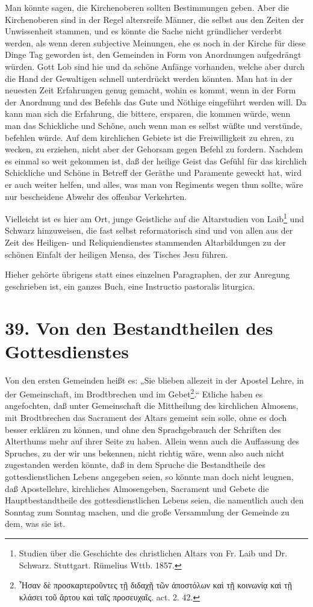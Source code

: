 Man könnte sagen, die Kirchenoberen sollten Bestimmungen geben. Aber die Kirchenoberen sind in der Regel altersreife Männer, die selbst aus den Zeiten der Unwissenheit stammen, und es könnte die Sache nicht gründlicher verderbt werden, als wenn deren subjective Meinungen, ehe es noch in der Kirche für diese Dinge Tag geworden ist, den Gemeinden
in Form von Anordnungen aufgedrängt würden. Gott Lob sind hie und da schöne Anfänge vorhanden, welche aber durch die Hand der Gewaltigen schnell unterdrückt werden könnten. Man hat in der neuesten Zeit Erfahrungen genug gemacht, wohin es kommt, wenn in der Form der Anordnung und des Befehls das Gute und Nöthige eingeführt werden will. Da kann man sich die Erfahrung, die bittere, ersparen, die kommen würde, wenn man das Schickliche und Schöne, auch wenn man es selbst wüßte und verstünde, befehlen würde. Auf dem kirchlichen Gebiete ist die Freiwilligkeit zu ehren, zu wecken, zu erziehen, nicht aber der Gehorsam gegen Befehl zu fordern. Nachdem es einmal so weit gekommen ist, daß der heilige Geist das Gefühl für das kirchlich Schickliche und Schöne in Betreff der Geräthe und Paramente geweckt hat, wird er auch weiter helfen, und alles, was man von Regiments wegen thun sollte, wäre nur bescheidene Abwehr des offenbar Verkehrten.

Vielleicht ist es hier am Ort, junge Geistliche auf die Altarstudien von Laib\footnote{Studien über die Geschichte des christlichen Altars von Fr. Laib und Dr. Schwarz. Stuttgart. Rümelius Wttb. 1857.} und Schwarz hinzuweisen, die fast selbst reformatorisch sind und von allen aus der Zeit des Heiligen- und Reliquiendienstes stammenden Altarbildungen zu der schönen Einfalt der heiligen Mensa, des Tisches Jesu führen.

Hieher gehörte übrigens statt eines einzelnen Paragraphen, der zur Anregung geschrieben ist, ein ganzes Buch, eine Instructio pastoralis liturgica.

\section[39. Bestandtheile des Gottesdienstes]{39. Von den Bestandtheilen des Gottesdienstes}

Von den ersten Gemeinden heißt es: „Sie blieben allezeit in der Apostel Lehre, in der Gemeinschaft, im Brodtbrechen und im Gebet\footnote{Ἦσαν δὲ προσκαρτεροῦντες τῇ διδαχῇ τῶν ἀποστόλων καὶ τῇ κοινωνίᾳ καὶ τῇ κλάσει τοῦ ἄρτου καὶ ταῖς προσευχαῖς. act. 2. 42.}.“ Etliche haben es angefochten, daß unter Gemeinschaft die Mittheilung des kirchlichen Almosens, mit Brodtbrechen das Sacrament des Altars gemeint sein solle, ohne es doch besser erklären zu können, und ohne den Sprachgebrauch der Schriften des Alterthums mehr auf ihrer Seite zu haben. Allein wenn auch die Auffassung des Spruches, zu der wir uns bekennen, nicht richtig wäre, wenn also auch nicht zugestanden werden könnte, daß in dem Spruche die Bestandtheile des gottesdienstlichen Lebens angegeben seien, so könnte man doch nicht leugnen, daß Apostellehre, kirchliches Almosengeben, Sacrament und Gebete die Hauptbestandtheile des gottesdienstlichen Lebens seien, die namentlich auch den Sonntag zum Sonntag machen, und die große Versammlung der Gemeinde zu dem, was sie ist.

